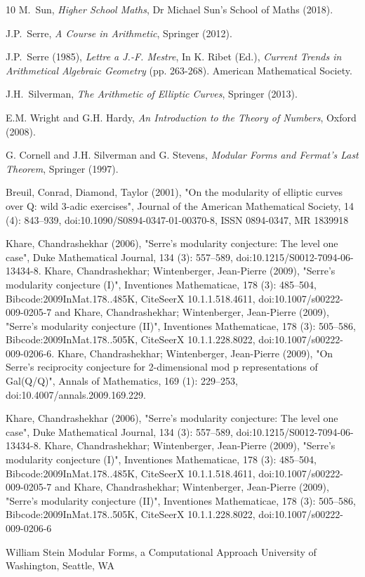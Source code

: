 \documentclass{article}
\theoremstyle{definition}
\theoremstyle{definition}
\theoremstyle{definition}
\begin{document}
\begin{thebibliography}{10}
   {\sc M.~Sun}, 
   {\em Higher School Maths}, 
   Dr Michael Sun's School of Maths (2018).

{\sc J.P.~Serre}, 
   {\em A Course in Arithmetic}, 
   Springer (2012).

{\sc J.P.~Serre} (1985),
{\em Lettre a J.-F. Mestre},
In K. Ribet (Ed.), {\em Current Trends in Arithmetical Algebraic Geometry} (pp. 263-268). American Mathematical Society. 


{\sc J.H.~Silverman}, 
   {\em The Arithmetic of Elliptic Curves}, 
   Springer (2013).

   {\sc E.M. Wright and G.H. Hardy}, 
   {\em An Introduction to the Theory of Numbers}, 
   Oxford  (2008).


   {\sc G. Cornell and J.H. Silverman and G. Stevens}, 
   {\em Modular Forms and Fermat's Last Theorem}, 
   Springer  (1997).

  {\sc Breuil,  Conrad,  Diamond, Taylor} (2001), "On the modularity of elliptic curves over Q: wild 3-adic exercises", Journal of the American Mathematical Society, 14 (4): 843–939, doi:10.1090/S0894-0347-01-00370-8, ISSN 0894-0347, MR 1839918

    Khare, Chandrashekhar (2006), "Serre's modularity conjecture: The level one case", Duke Mathematical Journal, 134 (3): 557–589, doi:10.1215/S0012-7094-06-13434-8.
 Khare, Chandrashekhar; Wintenberger, Jean-Pierre (2009), "Serre's modularity conjecture (I)", Inventiones Mathematicae, 178 (3): 485–504, Bibcode:2009InMat.178..485K, CiteSeerX 10.1.1.518.4611, doi:10.1007/s00222-009-0205-7 and Khare, Chandrashekhar; Wintenberger, Jean-Pierre (2009), "Serre's modularity conjecture (II)", Inventiones Mathematicae, 178 (3): 505–586, Bibcode:2009InMat.178..505K, CiteSeerX 10.1.1.228.8022, doi:10.1007/s00222-009-0206-6.
 Khare, Chandrashekhar; Wintenberger, Jean-Pierre (2009), "On Serre's reciprocity conjecture for 2-dimensional mod p representations of Gal(Q/Q)", Annals of Mathematics, 169 (1): 229–253, doi:10.4007/annals.2009.169.229.

 Khare, Chandrashekhar (2006), "Serre's modularity conjecture: The level one case", Duke Mathematical Journal, 134 (3): 557–589, doi:10.1215/S0012-7094-06-13434-8.
 Khare, Chandrashekhar; Wintenberger, Jean-Pierre (2009), "Serre's modularity conjecture (I)", Inventiones Mathematicae, 178 (3): 485–504, Bibcode:2009InMat.178..485K, CiteSeerX 10.1.1.518.4611, doi:10.1007/s00222-009-0205-7 and Khare, Chandrashekhar; Wintenberger, Jean-Pierre (2009), "Serre's modularity conjecture (II)", Inventiones Mathematicae, 178 (3): 505–586, Bibcode:2009InMat.178..505K, CiteSeerX 10.1.1.228.8022, doi:10.1007/s00222-009-0206-6

{\sc William Stein}
Modular Forms, a Computational Approach
  University of Washington, Seattle, WA
\end{thebibliography}
\end{document}
